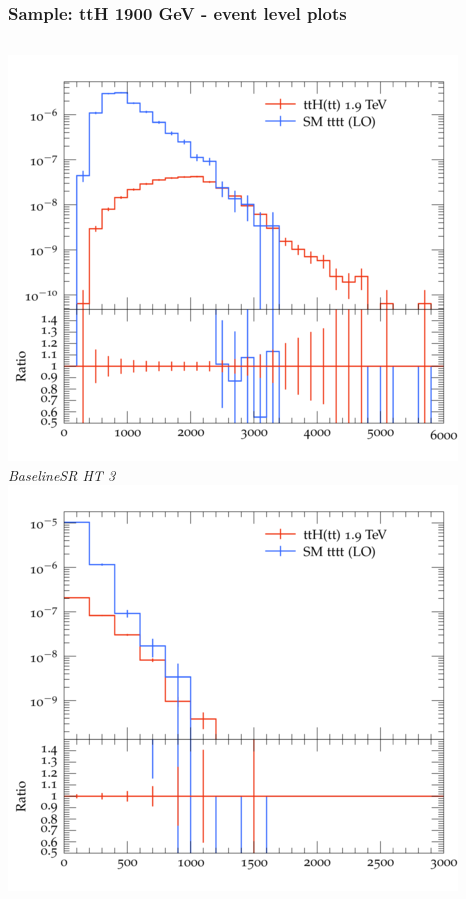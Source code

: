 \documentclass{beamer}
\begin{document}
\begin{frame}
\frametitle{Sample: ttH 1900 GeV - event level plots}
\begin{columns}
\includegraphics[width=\textwidth]{../plots/ttH_1900/tttt_ttH_1LOS/BaselineSR_HT_3.png}\\
\textit{\small BaselineSR HT 3}
\includegraphics[width=\textwidth]{../plots/ttH_1900/tttt_ttH_1LOS/BaselineSR_MET.png}\\

\end{columns}
\end{frame}
\end{document}
